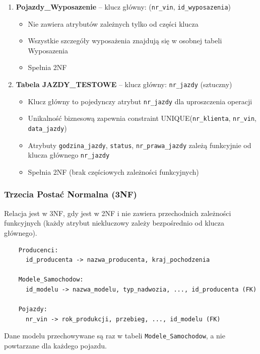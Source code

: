 \documentclass[a4paper,titleauthor]{mwart}
\begin{document}
	\begin{enumerate}
		\item \textbf{Pojazdy\_Wyposazenie} -- klucz główny: (\texttt{nr\_vin}, \texttt{id\_wyposazenia})
		\begin{itemize}
			\item Nie zawiera atrybutów zależnych tylko od części klucza
			\item Wszystkie szczegóły wyposażenia znajdują się w osobnej tabeli Wyposazenia
			\item Spełnia 2NF
		\end{itemize}
		
		\item \textbf{Tabela JAZDY\_TESTOWE} -- klucz główny: \texttt{nr\_jazdy} (sztuczny)
		\begin{itemize}
			\item Klucz główny to pojedynczy atrybut \texttt{nr\_jazdy} dla uproszczenia operacji
			\item Unikalność biznesową zapewnia constraint UNIQUE(\texttt{nr\_klienta}, \texttt{nr\_vin}, \texttt{data\_jazdy})
			\item Atrybuty \texttt{godzina\_jazdy}, \texttt{status}, \texttt{nr\_prawa\_jazdy} zależą funkcyjnie od klucza głównego \texttt{nr\_jazdy}
			\item Spełnia 2NF (brak częściowych zależności funkcyjnych)
		\end{itemize}
	\end{enumerate}

	\subsubsection{Trzecia Postać Normalna (3NF)}

	Relacja jest w 3NF, gdy jest w 2NF i nie zawiera przechodnich zależności funkcyjnych (każdy atrybut niekluczowy zależy bezpośrednio od klucza głównego).

	\begin{verbatim}
	Producenci:
	  id_producenta -> nazwa_producenta, kraj_pochodzenia

	Modele_Samochodow:
	  id_modelu -> nazwa_modelu, typ_nadwozia, ..., id_producenta (FK)

	Pojazdy:
	  nr_vin -> rok_produkcji, przebieg, ..., id_modelu (FK)
	\end{verbatim}

	Dane modelu przechowywane są raz w tabeli \texttt{Modele\_Samochodow}, a nie powtarzane dla każdego pojazdu.
\end{document}

